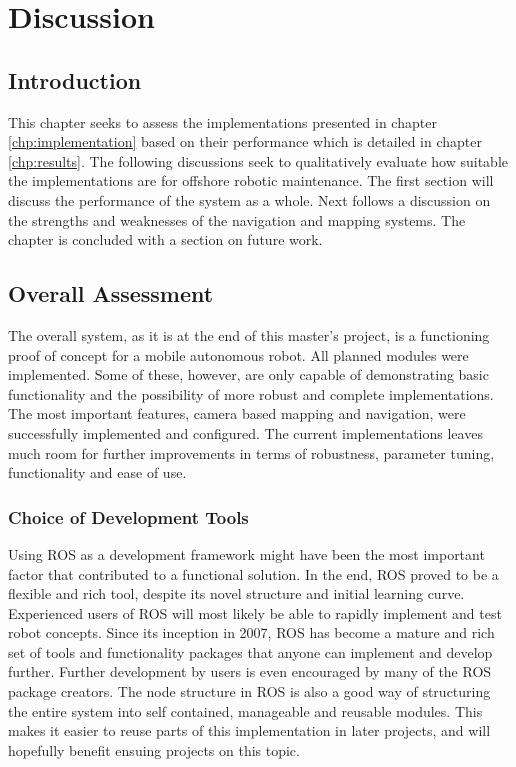 \chapter{Discussion}
\label{chp:discussion} 

\section{Introduction}

This chapter seeks to assess the implementations presented in chapter \ref{chp:implementation} based on their performance which is detailed in chapter \ref{chp:results}. The following discussions seek to qualitatively evaluate how suitable the implementations are for offshore robotic maintenance. The first section will discuss the performance of the system as a whole. Next follows a discussion on the strengths and weaknesses of the navigation and mapping systems. The chapter is concluded with a section on future work. 

\section{Overall Assessment}

The overall system, as it is at the end of this master's project, is a functioning proof of concept for a mobile autonomous robot. All planned modules were implemented. Some of these, however, are only capable of demonstrating basic functionality and the possibility of more robust and complete implementations. The most important features, camera based mapping and navigation, were successfully implemented and configured. The current implementations leaves much room for further improvements in terms of robustness, parameter tuning, functionality and ease of use.

\subsection{Choice of Development Tools}

Using \ac{ROS} as a development framework might have been the most important factor that contributed to a functional solution. In the end, \ac{ROS} proved to be a flexible and rich tool, despite its novel structure and initial learning curve. Experienced users of \ac{ROS} will most likely be able to rapidly implement and test robot concepts.  Since its inception in 2007, \ac{ROS} has become a mature and rich set of tools and functionality packages that anyone can implement and develop further. Further development by users is even encouraged by many of the \ac{ROS} package creators. The node structure in \ac{ROS} is also a good way of structuring the entire system into self contained, manageable and reusable modules. This makes it easier to reuse parts of this implementation in later projects, and will hopefully benefit ensuing projects on this topic.

